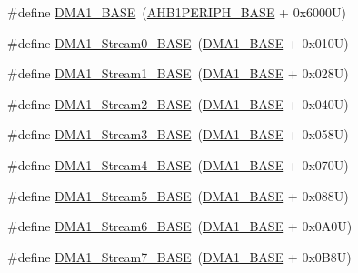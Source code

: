 \begin{DoxyCompactItemize}
\item 
\#define \hyperlink{group___peripheral__memory__map_gab2d8a917a0e4ea99a22ac6ebf279bc72}{D\+M\+A1\+\_\+\+B\+A\+SE}~(\hyperlink{group___peripheral__memory__map_ga811a9a4ca17f0a50354a9169541d56c4}{A\+H\+B1\+P\+E\+R\+I\+P\+H\+\_\+\+B\+A\+SE} + 0x6000\+U)
\item 
\#define \hyperlink{group___peripheral__memory__map_ga0d3c52aa35dcc68f78b704dfde57ba95}{D\+M\+A1\+\_\+\+Stream0\+\_\+\+B\+A\+SE}~(\hyperlink{group___peripheral__memory__map_gab2d8a917a0e4ea99a22ac6ebf279bc72}{D\+M\+A1\+\_\+\+B\+A\+SE} + 0x010\+U)
\item 
\#define \hyperlink{group___peripheral__memory__map_ga5b4152cef577e37eccc9311d8bdbf3c2}{D\+M\+A1\+\_\+\+Stream1\+\_\+\+B\+A\+SE}~(\hyperlink{group___peripheral__memory__map_gab2d8a917a0e4ea99a22ac6ebf279bc72}{D\+M\+A1\+\_\+\+B\+A\+SE} + 0x028\+U)
\item 
\#define \hyperlink{group___peripheral__memory__map_ga48a551ee91d3f07dd74347fdb35c703d}{D\+M\+A1\+\_\+\+Stream2\+\_\+\+B\+A\+SE}~(\hyperlink{group___peripheral__memory__map_gab2d8a917a0e4ea99a22ac6ebf279bc72}{D\+M\+A1\+\_\+\+B\+A\+SE} + 0x040\+U)
\item 
\#define \hyperlink{group___peripheral__memory__map_gac51deb54ff7cfe1290dfcf517ae67127}{D\+M\+A1\+\_\+\+Stream3\+\_\+\+B\+A\+SE}~(\hyperlink{group___peripheral__memory__map_gab2d8a917a0e4ea99a22ac6ebf279bc72}{D\+M\+A1\+\_\+\+B\+A\+SE} + 0x058\+U)
\item 
\#define \hyperlink{group___peripheral__memory__map_ga757a3c0d866c0fe68c6176156065a26b}{D\+M\+A1\+\_\+\+Stream4\+\_\+\+B\+A\+SE}~(\hyperlink{group___peripheral__memory__map_gab2d8a917a0e4ea99a22ac6ebf279bc72}{D\+M\+A1\+\_\+\+B\+A\+SE} + 0x070\+U)
\item 
\#define \hyperlink{group___peripheral__memory__map_ga0ded7bed8969fe2e2d616e7f90eb7654}{D\+M\+A1\+\_\+\+Stream5\+\_\+\+B\+A\+SE}~(\hyperlink{group___peripheral__memory__map_gab2d8a917a0e4ea99a22ac6ebf279bc72}{D\+M\+A1\+\_\+\+B\+A\+SE} + 0x088\+U)
\item 
\#define \hyperlink{group___peripheral__memory__map_ga58998ddc40adb6361704d6c9dad08125}{D\+M\+A1\+\_\+\+Stream6\+\_\+\+B\+A\+SE}~(\hyperlink{group___peripheral__memory__map_gab2d8a917a0e4ea99a22ac6ebf279bc72}{D\+M\+A1\+\_\+\+B\+A\+SE} + 0x0\+A0\+U)
\item 
\#define \hyperlink{group___peripheral__memory__map_ga82186dd6d3f60995d428b34c041919d7}{D\+M\+A1\+\_\+\+Stream7\+\_\+\+B\+A\+SE}~(\hyperlink{group___peripheral__memory__map_gab2d8a917a0e4ea99a22ac6ebf279bc72}{D\+M\+A1\+\_\+\+B\+A\+SE} + 0x0\+B8\+U)

\end{DoxyCompactItemize}
